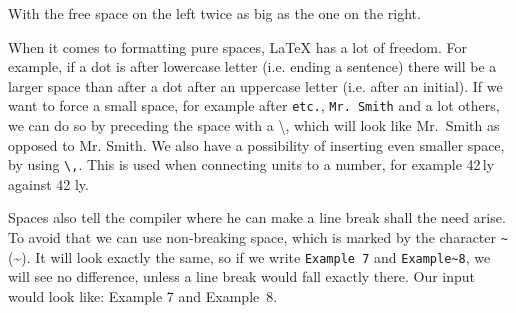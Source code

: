 With the free space on the left twice as big as the one on the right.

When it comes to formatting pure spaces, LaTeX has a lot of freedom. For example, if a dot is after lowercase letter (i.e. ending a sentence) there will be a larger space than after a dot after an uppercase letter (i.e. after an initial). If we want to force a small space, for example after \verb|etc.|, \verb|Mr. Smith| and a lot others, we can do so by preceding the space with a \textbackslash, which will look like Mr.\ Smith as opposed to Mr. Smith. We also have a possibility of inserting even smaller space, by using \verb|\,|. This is used when connecting units to a number, for example 42\,ly against 42 ly.

Spaces also tell the compiler where he can make a line break shall the need arise. To avoid that we can use non-breaking space, which is marked by the character \verb|~| (\textasciitilde{}). It will look exactly the same, so if we write \verb|Example 7| and \verb|Example~8|, we will see no difference, unless a line break would fall exactly there. Our input would look like: Example 7 and Example~8.